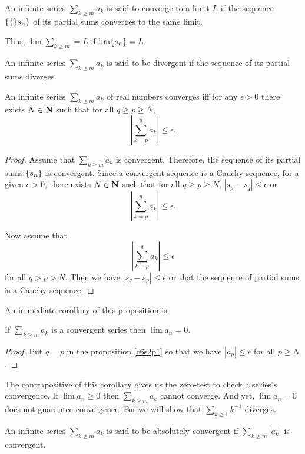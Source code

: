 \begin{defn}\label{c6s2d3}
An infinite series $\sum_{k \ge m}a_k$ is said to converge to a limit $L$
if the sequence $\{\{\}s_n\}$ of its partial sums converges to the same
limit.
\end{defn}
Thus, $\lim\sum_{k \ge m} = L$ if $\lim\{s_n\} = L$.

\begin{defn}\label{c6s2d4}
An infinite series $\sum_{k \ge m}a_k$ is said to be divergent if the 
sequence of its partial sums diverges.
\end{defn}

\begin{prop}\label{c6s2p1}
An infinite series $\sum_{k \ge m}a_k$ of real numbers converges iff for
any $\epsilon > 0$ there exists $N \in \mathbf{N}$ such that for all $q \ge p 
\ge N$,
\[
\left|\sum_{k=p}^q a_k\right| \le \epsilon.
\]
\end{prop}
\begin{proof}
Assume that $\sum_{k \ge m}a_k$ is convergent. Therefore, the sequence
of its partial sums $\{s_n\}$ is convergent. Since a convergent sequence
is a Cauchy sequence, for a given $\epsilon > 0$, there exists $N \in \mathbf{N}$
such that for all $q \ge p \ge N$, $|s_p - s_q| \le \epsilon$ or
\[
\left|\sum_{k=p}^q a_k\right| \le \epsilon.
\]

Now assume that
\[
\left|\sum_{k=p}^q a_k\right| \le \epsilon
\]
for all $q > p > N$. Then we have $|s_q - s_p| \le \epsilon$ or that the
sequence of partial sums is a Cauchy sequence.
\end{proof}

An immediate corollary of this proposition is
\begin{cor}\label{c6s2c1}
If $\sum_{k \ge m}a_k$ is a convergent series then $\lim a_n = 0$.
\end{cor}
\begin{proof}
Put $q = p$ in the proposition \ref{c6s2p1} so that we have $|a_p| \le
\epsilon$ for all $p \ge N$.
\end{proof}

The contrapositive of this corollary gives us the zero-test to check a 
series's convergence. If $\lim a_n \ge 0$ then $\sum_{k \ge m}a_k$ 
cannot converge. And yet, $\lim a_n = 0$ does not guarantee convergence.
For we will show that $\sum_{k \ge 1} k^{-1}$ diverges.

\begin{defn}\label{c6s2d5}
An infinite series $\sum_{k \ge m}a_k$ is said to be absolutely convergent
if $\sum_{k \ge m}|a_k|$ is convergent.
\end{defn}

